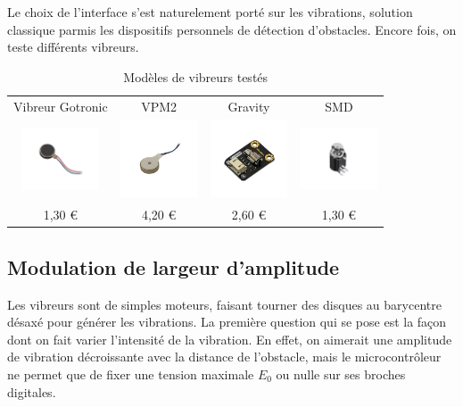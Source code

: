 \documentclass[a4paper, 11pt]{article}
\begin{document}
\par Le choix de l'interface s'est naturelement porté sur les vibrations, solution classique parmis les dispositifs personnels de détection d'obstacles. Encore fois, on teste différents vibreurs. 

\begin{table}[h!]
\centering
\begin{tabular}{cccc}
Vibreur Gotronic & VPM2 & Gravity & SMD \\
  \includegraphics[width=2.3cm]{images/gotronic_vib.jpg}
& \includegraphics[width=2.3cm]{images/vpm2.jpg}
& \includegraphics[width=2.3cm]{images/gravity.jpg}
& \includegraphics[width=2.3cm]{images/smd.jpg} \\
1,30 € & 4,20 € & 2,60 € & 1,30 € \\
\end{tabular}
\caption{Modèles de vibreurs testés}
\end{table}


\subsection{Modulation de largeur d'amplitude}

\par Les vibreurs sont de simples moteurs, faisant tourner des disques au barycentre désaxé pour générer les vibrations. La première question qui se pose est la façon dont on fait varier l'intensité de la vibration. En effet, on aimerait une amplitude de vibration décroissante avec la distance de l'obstacle, mais le microcontrôleur ne permet que de fixer une tension maximale $E_0$ ou nulle sur ses broches digitales.
\end{document}
